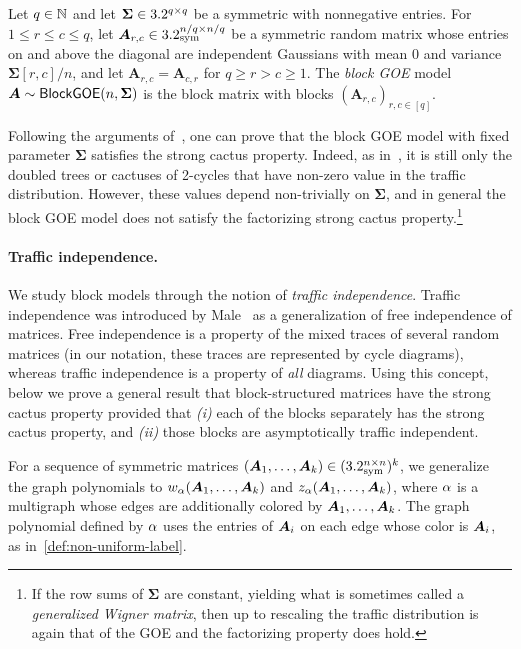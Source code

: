 \begin{definition}\label{def:blockgoe}
    Let $q\in \mathbb{N}$ and let $\mathbf{\Sigma} \in 3.2^{q \times q}$ be a symmetric with nonnegative entries.
    For $1 \leq r \leq c \leq q$, let $\bm A_{r,c}\in 3.2_{\mathrm{sym}}^{n/q \times n/q}$ be a symmetric random matrix whose entries on and above the diagonal are independent Gaussians with mean $0$ and variance $\bm\Sigma[r,c]/n$, and let $\bm A_{r,c}=\bm A_{c,r}$ for $q \geq r > c \geq 1$.
    The \emph{block GOE} model ${\bm A} \sim \textsf{\upshape BlockGOE}(n,\bm\Sigma)$ is the block matrix with blocks $(\bm A_{r,c})_{r,c\in[q]}$.
\end{definition}

Following the arguments of~\cite{male2020traffic,jones2025fourier}, one can prove that the block GOE model with fixed parameter $\bm\Sigma$ satisfies the strong cactus property.
Indeed, as in~, it is still only the doubled trees or cactuses of 2-cycles that have non-zero value in the traffic distribution.
However, these values depend non-trivially on $\bm\Sigma$, and in general the block GOE model does {not} satisfy the factorizing strong cactus property.\footnote{If the row sums of $\bm\Sigma$ are constant, yielding what is sometimes called a \emph{generalized Wigner matrix}, then up to rescaling the traffic distribution is again that of the GOE and the factorizing property does hold.}

\paragraph{Traffic independence.} 
We study block models through the notion of {\em traffic independence}.
Traffic independence was
introduced by Male~\cite{male2020traffic}
as a generalization of
free independence of matrices. Free
independence is a property
of the mixed traces of
several random matrices
(in our notation, these traces are
represented by cycle diagrams),
whereas traffic independence
is a property of {\em all}
diagrams. Using this concept, below we 
prove a general result that 
block-structured matrices have the
strong cactus property 
provided that {\em (i)}
each of the blocks separately has
the strong cactus property,
and {\em (ii)} those blocks
are asymptotically traffic
independent.


For a sequence of symmetric matrices $({\bm A}_1, \dots, {\bm A}_k) \in (3.2^{n \times n}_{\mathrm{sym}})^k$, we generalize the graph polynomials to 
$w_\alpha({\bm A}_1, \dots, {\bm A}_k)$ and $z_\alpha({\bm A}_1, \dots, {\bm A}_k)$, where $\alpha$ is a multigraph whose edges are additionally colored by ${\bm A}_1, \dots, {\bm A}_k$.
The graph polynomial defined by $\alpha$ uses the entries of ${\bm A}_i$ on each edge whose color is ${\bm A}_i$, as in~\cref{def:non-uniform-label}.

